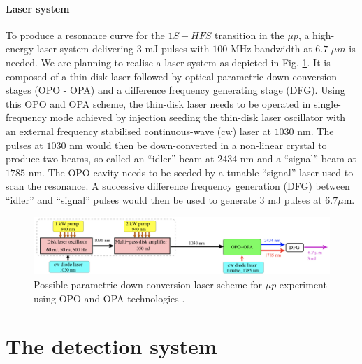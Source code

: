 \documentclass[12pt]{article}
\begin{document}
\paragraph{Laser system}
To produce a resonance curve for the $1S - HFS$ transition in the $\mu{p}$, a high-energy laser system delivering $3$ mJ pulses with $100$ MHz bandwidth at $6.7$ ${\mu}m$ is needed. We are planning to realise a laser system as depicted in Fig. \ref{fig:opopascheme}. It is composed of a thin-disk laser followed by optical-parametric down-conversion stages (OPO - OPA) and a difference frequency generating stage (DFG). Using this OPO and OPA scheme, the thin-disk laser needs to be operated in single-frequency mode achieved by injection seeding the thin-disk laser oscillator with an external frequency stabilised continuous-wave (cw) laser at $1030$ nm. The pulses at $1030$ nm would then be down-converted in a non-linear crystal to produce two beams, so called an ``idler'' beam at $2434$ nm and a ``signal'' beam at $1785$ nm. The OPO cavity needs to be seeded by a tunable ``signal'' laser used to scan the resonance. A successive difference frequency generation (DFG) between ``idler'' and ``signal'' pulses would then be used to generate $3$ mJ pulses at $6.7 {\mu}$m. 
\begin{figure}[h]
\includegraphics[width=1.0\textwidth]{img/OPOschemeOPA}
\caption{Possible parametric down-conversion laser scheme for $\mu{p}$ experiment using OPO and OPA technologies \cite{proposal}.}
\label{fig:opopascheme}
\end{figure}


\section{The detection system}
\end{document}

